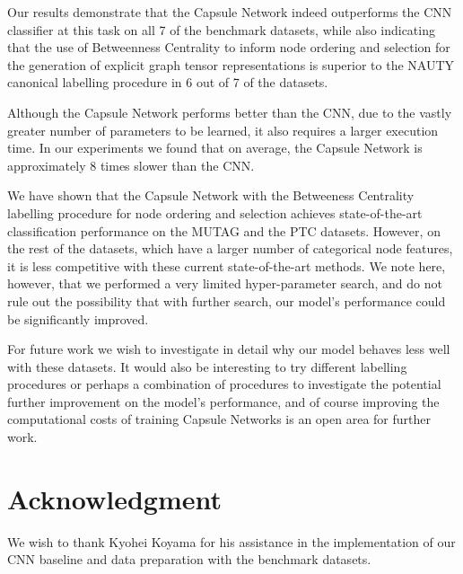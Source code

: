 \documentclass[conference]{IEEEtran}
\begin{document}
Our results demonstrate that the Capsule Network indeed outperforms the CNN classifier at this task on all 7 of the benchmark datasets, while also indicating that the use of Betweenness Centrality to inform node ordering and selection for the generation of explicit graph tensor representations is superior to the NAUTY canonical labelling procedure \cite{mckay2014practical} in 6 out of 7 of the datasets.

Although the Capsule Network performs better than the CNN, due to the vastly greater number of parameters to be learned, it also requires a larger execution time. In our experiments we found that on average, the Capsule Network is approximately 8 times slower than the CNN.

We have shown that the Capsule Network with the Betweeness Centrality labelling procedure for node ordering and selection achieves state-of-the-art classification performance on the MUTAG and the PTC datasets. However, on the rest of the datasets, which have a larger number of categorical node features, it is less competitive with these current state-of-the-art methods. We note here, however, that we performed a very limited hyper-parameter search, and do not rule out the possibility that with further search, our model's performance could be significantly improved.

For future work we wish to investigate in detail why our model behaves less well with these datasets. It would also be interesting to try different labelling procedures or perhaps a combination of procedures to investigate the potential further improvement on the model's performance, and of course improving the computational costs of training Capsule Networks is an open area for further work.


\section*{Acknowledgment}



We wish to thank Kyohei Koyama for his assistance in the implementation of our CNN baseline and data preparation with the benchmark datasets. 
\end{document}
